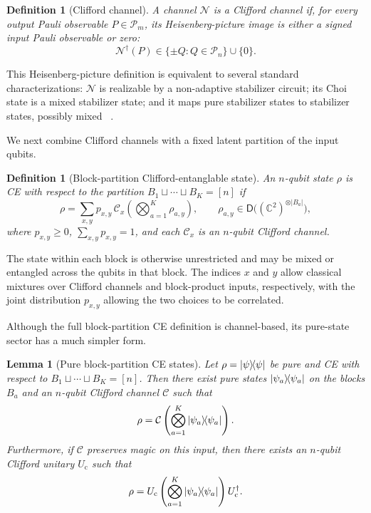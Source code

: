 \documentclass[
  aps,
  prx,
  reprint,
  superscriptaddress,
  amsmath,
  amssymb,
  nofootinbib,
  longbibliography
]{revtex4-2}
\newtheorem{lemma}[theorem]{Lemma}
\newtheorem{definition}[theorem]{Definition}
\newcommand{\D}{\mathsf{D}}
\newcommand{\Pc}{\mathcal{P}}
\newcommand{\map}[1]{\mathcal{#1}}
\begin{document}
\begin{definition}[Clifford channel]
\label{def:clifford-channel}
A channel $\map N$ is a \emph{Clifford channel} if, for every output
Pauli observable $P\in\Pc_m$, its Heisenberg-picture image is either a
signed input Pauli observable or zero:
\begin{equation}
\map N^\dagger(P)\in \{\pm Q:Q\in\Pc_n\}\cup\{0\}.
\end{equation}
\end{definition}

This Heisenberg-picture definition is equivalent to several standard
characterizations: $\map N$ is realizable by a non-adaptive stabilizer
circuit; its Choi state is a mixed stabilizer state; and it maps pure
stabilizer states to stabilizer states, possibly mixed
~\cite{yashin2025characterization}.


We next combine Clifford channels with a fixed latent partition of the input
qubits.  

\begin{definition}[Block-partition Clifford-entanglable state]
\label{def:block-partition-ce}
An $n$-qubit state $\rho$ is CE with respect to the partition
$B_1\sqcup\cdots\sqcup B_K=[n]$ if
\begin{equation}
\rho
=
\sum_{x,y}p_{x,y}\,
\map C_x
\left(
\bigotimes_{a=1}^{K}\rho_{a,y}
\right),
\qquad
\rho_{a,y}\in \D\!\bigl((\mathbb C^2)^{\otimes |B_a|}\bigr),
\label{eq:block-partition-ce}
\end{equation}
where $p_{x,y}\ge 0$, $\sum_{x,y}p_{x,y}=1$, and each
$\map C_x$ is an $n$-qubit Clifford channel.
\end{definition}
\noindent The state within each block is otherwise unrestricted and may be mixed or
entangled across the qubits in that block.  The indices $x$ and $y$ allow
classical mixtures over Clifford channels and block-product inputs,
respectively, with the joint distribution $p_{x,y}$ allowing the two choices
to be correlated.




Although the full block-partition CE definition is channel-based, its pure-state sector has a much simpler form.
\begin{lemma}[Pure block-partition CE states]
\label{lem:pure-block-partition-ce}
Let $\rho=\dyad{\psi}$ be pure and CE with respect to
$B_1\sqcup\cdots\sqcup B_K=[n]$.  Then there exist pure states
$\dyad{\psi_a}$ on the blocks $B_a$ and an $n$-qubit Clifford channel
$\map C$ such that
\begin{equation}
\rho
=
\map C
\left(
\bigotimes_{a=1}^{K}\dyad{\psi_a}
\right).
\end{equation}
Furthermore, if $\map C$ preserves  magic  on this input, then there
exists an $n$-qubit Clifford unitary $U_{\mathrm c}$ such that
\begin{equation}
\rho
=
U_{\mathrm c}
\left(
\bigotimes_{a=1}^{K}\dyad{\psi_a}
\right)
U_{\mathrm c}^{\dagger}.
\label{UC_conjecture}
\end{equation}
\end{lemma}
\end{document}
